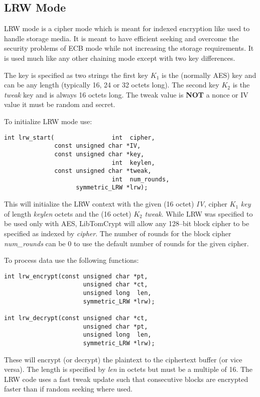 \documentclass[synpaper]{book}
\begin{document}
\subsection{LRW Mode}
LRW mode is a cipher mode which is meant for indexed encryption like used to handle storage media.  It is meant to have efficient seeking and overcome the 
security problems of ECB mode while not increasing the storage requirements.  It is used much like any other chaining mode except with two key differences.

The key is specified as two strings the first key $K_1$ is the (normally AES) key and can be any length (typically 16, 24 or 32 octets long).  The second key 
$K_2$ is the \textit{tweak} key and is always 16 octets long.  The tweak value is \textbf{NOT} a nonce or IV value it must be random and secret.  

To initialize LRW mode use:

\begin{verbatim}
int lrw_start(                int  cipher,
              const unsigned char *IV,
              const unsigned char *key,       
                              int  keylen,
              const unsigned char *tweak,
                              int  num_rounds, 
                    symmetric_LRW *lrw);
\end{verbatim}

This will initialize the LRW context with the given (16 octet) \textit{IV}, cipher $K_1$ \textit{key} of length \textit{keylen} octets and the (16 octet) $K_2$ \textit{tweak}.  
While LRW was specified to be used only with AES, LibTomCrypt will allow any 128--bit block cipher to be specified as indexed by \textit{cipher}.  The
number of rounds for the block cipher \textit{num\_rounds} can be 0 to use the default number of rounds for the given cipher.

To process data use the following functions:

 
\begin{verbatim}
int lrw_encrypt(const unsigned char *pt, 
                      unsigned char *ct, 
                      unsigned long  len, 
                      symmetric_LRW *lrw);

int lrw_decrypt(const unsigned char *ct, 
                      unsigned char *pt, 
                      unsigned long  len, 
                      symmetric_LRW *lrw);
\end{verbatim}

These will encrypt (or decrypt) the plaintext to the ciphertext buffer (or vice versa).  The length is specified by \textit{len} in octets but must be a multiple
of 16.  The LRW code uses a fast tweak update such that consecutive blocks are encrypted faster than if random seeking where used.  
\end{document}
